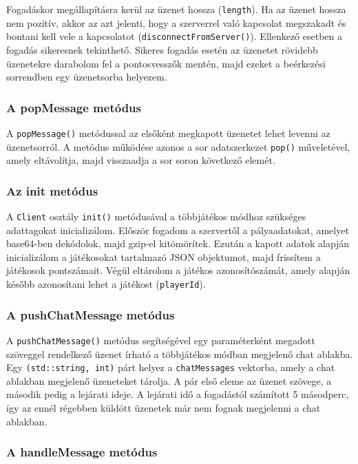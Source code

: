 Fogadáskor megállapításra kerül az üzenet hossza (\verb|length|). Ha az üzenet hossza nem pozitív, akkor az azt jelenti, hogy a szerverrel való kapcsolat megszakadt és bontani kell vele a kapcsolatot (\verb|disconnectFromServer()|). Ellenkező esetben a fogadás sikeresnek tekinthető. Sikeres fogadás esetén az üzenetet rövidebb üzenetekre darabolom fel a pontosvesszők mentén, majd ezeket a beérkezési sorrendben egy üzenetsorba helyezem.

\subsubsection{A popMessage metódus}

A \verb|popMessage()| metódussal az elsőként megkapott üzenetet lehet levenni az üzenetsorról. A metódus működése azonos a sor adatszerkezet \verb|pop()| műveletével, amely eltávolítja, majd visszaadja a sor soron következő elemét.

\subsubsection{Az init metódus}

A \verb|Client| osztály \verb|init()| metódusával a többjátékos módhoz szükséges adattagokat inicializálom. Először fogadom a szervertől a pályaadatokat, amelyet base64-ben dekódolok, majd gzip-el kitömörítek. Ezután a kapott adatok alapján inicializálom a játékosokat tartalmazó JSON objektumot, majd frissítem a játékosok pontszámait. Végül eltárolom a játékos azonosítószámát, amely alapján később azonosítani lehet a játékost (\verb|playerId|).

\subsubsection{A pushChatMessage metódus}

A \verb|pushChatMessage()| metódus segítségével egy paraméterként megadott szöveggel rendelkező üzenet írható a többjátékos módban megjelenő chat ablakba. Egy \verb|(std::string, int)| párt helyez a \verb|chatMessages| vektorba, amely a chat ablakban megjelenő üzeneteket tárolja. A pár első eleme az üzenet szövege, a második pedig a lejárati ideje. A lejárati idő a fogadástól számított 5 másodperc, így az ennél régebben küldött üzenetek már nem fognak megjelenni a chat ablakban.

\subsubsection{A handleMessage metódus}

